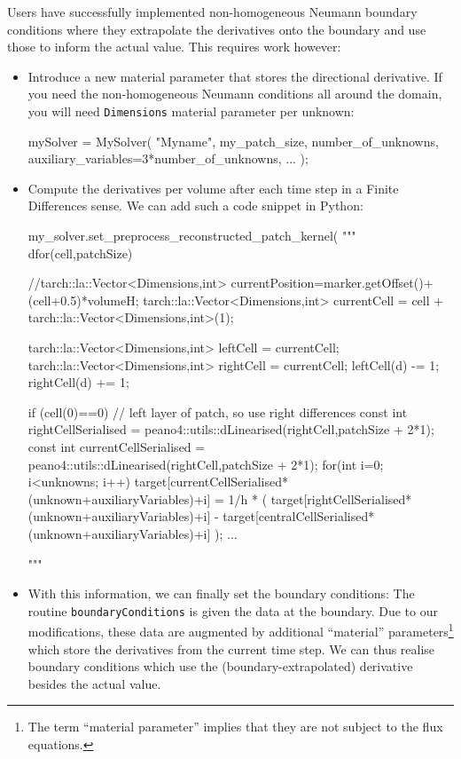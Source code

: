 Users have successfully implemented non-homogeneous Neumann boundary
conditions where they extrapolate the derivatives onto the boundary and use
those to inform the actual value.
This requires work however:

\begin{itemize}
  \item Introduce a new material parameter that stores the directional
  derivative. If you need the non-homogeneous Neumann conditions all around the
  domain, you will need \texttt{Dimensions} material parameter per unknown:
  \begin{code}
mySolver = MySolver( "Myname", my_patch_size, number_of_unknowns,
  auxiliary_variables=3*number_of_unknowns, ... );
  \end{code}
  \item Compute the derivatives per volume after each time step in a Finite
  Differences sense. We can add such a code snippet in Python:
  \begin{code}
my_solver.set_preprocess_reconstructed_patch_kernel( """
  dfor(cell,patchSize) {
    //tarch::la::Vector<Dimensions,int> currentPosition=marker.getOffset()+(cell+0.5)*volumeH;
    tarch::la::Vector<Dimensions,int> currentCell = cell + tarch::la::Vector<Dimensions,int>(1);

    tarch::la::Vector<Dimensions,int> leftCell  = currentCell;
    tarch::la::Vector<Dimensions,int> rightCell = currentCell;
    leftCell(d)  -= 1;
    rightCell(d) += 1;

    if (cell(0)==0) { // left layer of patch, so use right differences
      const int rightCellSerialised  =
        peano4::utils::dLinearised(rightCell,patchSize + 2*1); 
      const int currentCellSerialised = 
        peano4::utils::dLinearised(rightCell,patchSize + 2*1); 
      for(int i=0; i<unknowns; i++) { 
        target[currentCellSerialised*(unknown+auxiliaryVariables)+i] = 
         1/h * (
           target[rightCellSerialised*(unknown+auxiliaryVariables)+i] -
           target[centralCellSerialised*(unknown+auxiliaryVariables)+i]
         );
  ...
      }}}"""
\end{code}
  \item With this information, we can finally set the boundary conditions:
  The routine \texttt{boundaryConditions} is given the data at the boundary.
  Due to our modifications, these data are augmented by additional ``material''
  parameters\footnote{The term ``material parameter'' implies that they are not
  subject to the flux equations.} which store the derivatives from the current
  time step.
  We can thus realise boundary conditions which use the (boundary-extrapolated)
  derivative besides the actual value.
\end{itemize}



